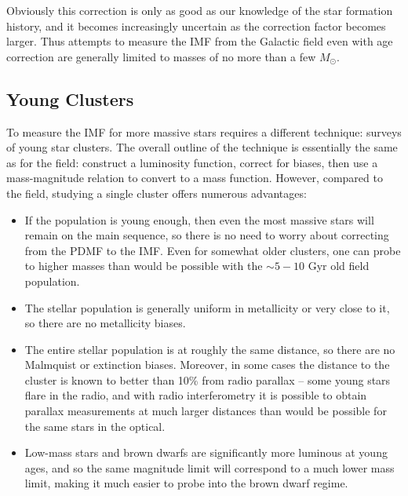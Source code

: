 Obviously this correction is only as good as our knowledge of the star formation history, and it becomes increasingly uncertain as the correction factor becomes larger. Thus attempts to measure the IMF from the Galactic field even with age correction are generally limited to masses of no more than a few $M_\odot$.

\subsection{Young Clusters}

To measure the IMF for more massive stars requires a different technique: surveys of young star clusters. The overall outline of the technique is essentially the same as for the field: construct a luminosity function, correct for biases, then use a mass-magnitude relation to convert to a mass function. However, compared to the field, studying a single cluster offers numerous advantages:
\begin{itemize}
\item If the population is young enough, then even the most massive stars will remain on the main sequence, so there is no need to worry about correcting from the PDMF to the IMF. Even for somewhat older clusters, one can probe to higher masses than would be possible with the $\sim 5-10$ Gyr old field population.
\item The stellar population is generally uniform in metallicity or very close to it, so there are no metallicity biases.
\item The entire stellar population is at roughly the same distance, so there are no Malmquist or extinction biases. Moreover, in some cases the distance to the cluster is known to better than 10\% from radio parallax -- some young stars flare in the radio, and with radio interferometry it is possible to obtain parallax measurements at much larger distances than would be possible for the same stars in the optical. 
\item Low-mass stars and brown dwarfs are significantly more luminous at young ages, and so the same magnitude limit will correspond to a much lower mass limit, making it much easier to probe into the brown dwarf regime.
\end{itemize}

